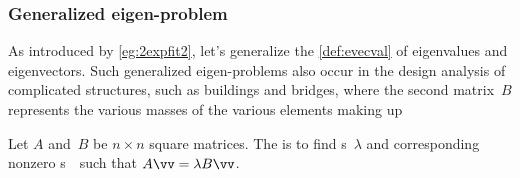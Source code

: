 \subsubsection{Generalized eigen-problem}


As introduced by \cref{eg:2expfit2}, let's generalize the \cref{def:evecval} of eigenvalues and eigenvectors.
Such generalized eigen-problems also occur in the design analysis of complicated structures, such as buildings and bridges, where the second matrix~\(B\) represents the various masses of the various elements making up 

\begin{definition} \label{def:geneig}
Let \(A\) and~\(B\) be \(n\times n\) square matrices. 
The  is to find  s~\(\lambda\) and corresponding nonzero s~\vv\ such that \(A\vv=\lambda B\vv\).
\end{definition}


